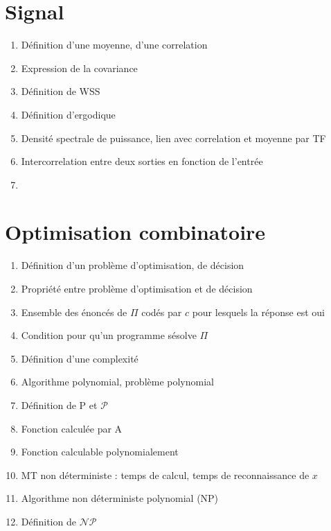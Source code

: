 \documentclass{article}
\begin{document}
\setcounter{tocdepth}{4}
\tableofcontents
\newpage

\part{Signal}
\begin{enumerate}
\item Définition d'une moyenne, d'une correlation
\item Expression de la covariance
\item Définition de WSS
\item Définition d'ergodique
\item Densité spectrale de puissance, lien avec correlation et moyenne par TF
\item Intercorrelation entre deux sorties en fonction de l'entrée
\item 
\end{enumerate}

\part{Optimisation combinatoire}
\begin{enumerate}
\item Définition d'un problème d'optimisation, de décision
\item Propriété entre problème d'optimisation et de décision
\item Ensemble des énoncés de $\Pi$ codés par $c$ pour lesquels la réponse est oui
\item Condition pour qu'un programme sésolve $\Pi$
\item Définition d'une complexité
\item Algorithme polynomial, problème polynomial
\item Définition de P et $\mathcal{P}$
\item Fonction calculée par A
\item Fonction calculable polynomialement
\item MT non déterministe : temps de calcul, temps de reconnaissance de $x$
\item Algorithme non déterministe polynomial (NP)
\item Définition de $\mathcal{N}\mathcal{P}$
\end{enumerate}
\end{document}

